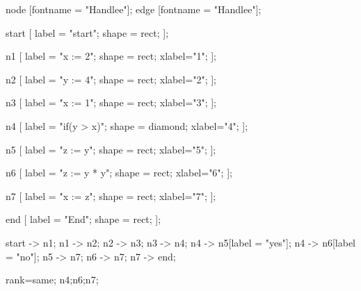  {
node [fontname = "Handlee"];
edge [fontname = "Handlee"];

start [
 label = "start";
 shape = rect; 
];

n1 [
 label = "x := 2";
 shape = rect;
 xlabel="1";
];

n2 [
 label = "y := 4";
 shape = rect;
 xlabel="2";
];

n3 [
 label = "x := 1";
 shape = rect;
 xlabel="3";
];

n4 [
 label = "if(y > x)";
 shape = diamond;
 xlabel="4";
];

n5 [
 label = "z := y";
 shape = rect;
 xlabel="5";
];

n6 [
 label = "z := y * y";
 shape = rect;
 xlabel="6";
];

n7 [
 label = "x := z";
 shape = rect;
 xlabel="7";
];

end [
 label = "End";
 shape = rect; 
];

start -> n1;
n1 -> n2;
n2 -> n3;
n3 -> n4;
n4 -> n5[label = "yes"];
n4 -> n6[label = "no"];
n5 -> n7;
n6 -> n7;
n7 -> end;


{
rank=same;
n4;n6;n7;
}

}